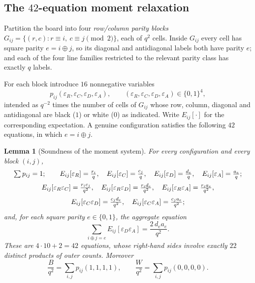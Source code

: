 \documentclass[11pt]{amsart}
\newtheorem{lemma}[theorem]{Lemma}
\theoremstyle{definition}
\theoremstyle{remark}
\begin{document}
\subsection{The \texorpdfstring{$42$}{42}-equation moment relaxation}

Partition the board into four \emph{row/column parity blocks} $G_{ij}=\{(r,c):r\equiv i,\ c\equiv j\pmod2\}$, each of $q^2$ cells. Inside $G_{ij}$ every cell has square parity $e=i\oplus j$, so its diagonal and antidiagonal labels both have parity $e$; and each of the four line families restricted to the relevant parity class has exactly $q$ labels.

For each block introduce $16$ nonnegative variables
\[
p_{ij}(\varepsilon_R,\varepsilon_C,\varepsilon_D,\varepsilon_A),\qquad(\varepsilon_R,\varepsilon_C,\varepsilon_D,\varepsilon_A)\in\{0,1\}^4,
\]
intended as $q^{-2}$ times the number of cells of $G_{ij}$ whose row, column, diagonal and antidiagonal are black ($1$) or white ($0$) as indicated. Write $E_{ij}[\cdot]$ for the corresponding expectation. A genuine configuration satisfies the following $42$ equations, in which $e=i\oplus j$.

\begin{lemma}[Soundness of the moment system]\label{lem:moments}
For every configuration and every block $(i,j)$,
\begin{gather}
\textstyle\sum p_{ij}=1;\qquad
E_{ij}[\varepsilon_R]=\tfrac{r_i}{q},\quad E_{ij}[\varepsilon_C]=\tfrac{c_j}{q},\quad E_{ij}[\varepsilon_D]=\tfrac{d_e}{q},\quad E_{ij}[\varepsilon_A]=\tfrac{a_e}{q};
\label{eq:mom1}\\[2pt]
E_{ij}[\varepsilon_R\varepsilon_C]=\tfrac{r_ic_j}{q^2},\quad
E_{ij}[\varepsilon_R\varepsilon_D]=\tfrac{r_id_e}{q^2},\quad
E_{ij}[\varepsilon_R\varepsilon_A]=\tfrac{r_ia_e}{q^2},
\label{eq:mom2}\\[2pt]
E_{ij}[\varepsilon_C\varepsilon_D]=\tfrac{c_jd_e}{q^2},\quad
E_{ij}[\varepsilon_C\varepsilon_A]=\tfrac{c_ja_e}{q^2};
\notag
\end{gather}
and, for each square parity $e\in\{0,1\}$, the \emph{aggregate} equation
\begin{equation}\label{eq:mom3}
\sum_{i\oplus j=e}E_{ij}[\varepsilon_D\varepsilon_A]=\frac{2\,d_ea_e}{q^2} .
\end{equation}
These are $4\cdot10+2=42$ equations, whose right-hand sides involve exactly $22$ distinct products of outer counts. Moreover
\begin{equation}\label{eq:BW}
\frac{B}{q^2}=\sum_{i,j}p_{ij}(1,1,1,1),\qquad \frac{W}{q^2}=\sum_{i,j}p_{ij}(0,0,0,0).
\end{equation}
\end{lemma}
\end{document}
